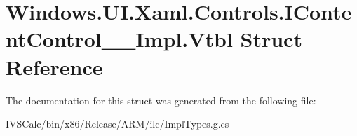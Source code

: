 \hypertarget{struct_windows_1_1_u_i_1_1_xaml_1_1_controls_1_1_i_content_control_____impl_1_1_vtbl}{}\section{Windows.\+U\+I.\+Xaml.\+Controls.\+I\+Content\+Control\+\_\+\+\_\+\+Impl.\+Vtbl Struct Reference}
\label{struct_windows_1_1_u_i_1_1_xaml_1_1_controls_1_1_i_content_control_____impl_1_1_vtbl}


The documentation for this struct was generated from the following file\+:\begin{DoxyCompactItemize}
\item 
I\+V\+S\+Calc/bin/x86/\+Release/\+A\+R\+M/ilc/Impl\+Types.\+g.\+cs\end{DoxyCompactItemize}

